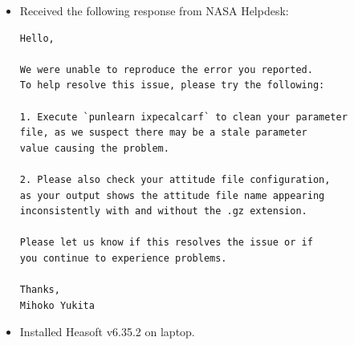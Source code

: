 	\begin{itemize}
		\item Received the following response from NASA Helpdesk:
        \begin{verbatim}
Hello,

We were unable to reproduce the error you reported.
To help resolve this issue, please try the following:

1. Execute `punlearn ixpecalcarf` to clean your parameter
file, as we suspect there may be a stale parameter
value causing the problem.

2. Please also check your attitude file configuration,
as your output shows the attitude file name appearing
inconsistently with and without the .gz extension.

Please let us know if this resolves the issue or if
you continue to experience problems.

Thanks,
Mihoko Yukita
        \end{verbatim}

        \item Installed Heasoft v6.35.2 on laptop.
	\end{itemize}